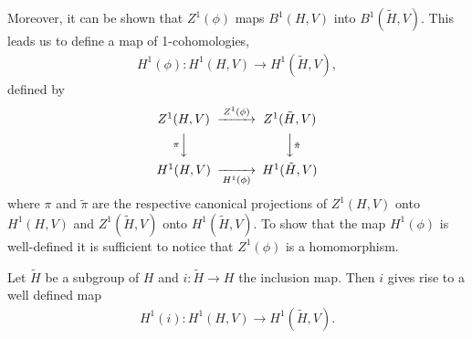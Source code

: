 Moreover, it can be shown that $Z^1(\phi)$ maps $B^1(H, V)$ into $B^1(\tilde{H}, V)$. This leads us to define a map of 1-cohomologies,
\begin{eqnarray*}
	H^1(\phi):H^1(H, V) \rightarrow H^1(\tilde{H}, V),
\end{eqnarray*}
defined by
\begin{displaymath}
\begin{CD}
	Z^1(H, V) @>Z^1(\phi)>> Z^1(\tilde{H}, V)\\
	@V{\pi}VV                                  @VV{\tilde{\pi}}V\\
	H^1(H, V) @>>H^1(\phi)> H^1(\tilde{H}, V)
\end{CD}
\end{displaymath}
where $\pi$ and $\tilde\pi$ are the respective canonical projections of $Z^1(H, V)$ onto $H^1(H, V)$ and $Z^1(\tilde{H}, V)$ onto $H^1(\tilde{H}, V)$. To show that the map $H^1(\phi)$ is well-defined it is sufficient to notice that $Z^1(\phi)$ is a homomorphism.

\begin{example}
Let $\tilde{H}$ be a subgroup of $H$ and $i:\tilde{H}\rightarrow H$ the inclusion map. Then $i$ gives rise to a well defined map
\begin{eqnarray*}
H^1(i):H^1(H, V)\rightarrow H^1(\tilde{H}, V).
\end{eqnarray*}
\end{example}


